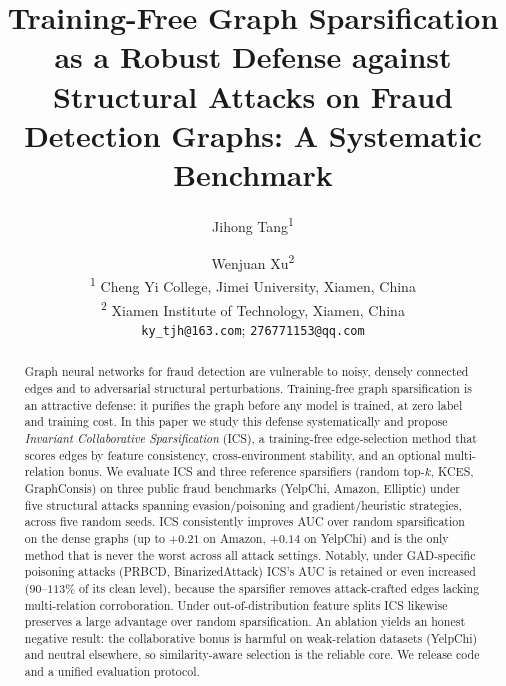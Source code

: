 \documentclass[11pt]{article}
\begin{document}
\title{Training-Free Graph Sparsification as a Robust Defense against Structural Attacks on Fraud Detection Graphs: A Systematic Benchmark}

\author{
Jihong Tang\textsuperscript{1} \and Wenjuan Xu\textsuperscript{2} \\
\textsuperscript{1} Cheng Yi College, Jimei University, Xiamen, China \\
\textsuperscript{2} Xiamen Institute of Technology, Xiamen, China \\
\texttt{ky\_tjh@163.com}; \texttt{276771153@qq.com}
}

\date{}

\maketitle

\begin{abstract}
Graph neural networks for fraud detection are vulnerable to noisy, densely connected edges and to adversarial structural perturbations. Training-free graph sparsification is an attractive defense: it purifies the graph before any model is trained, at zero label and training cost. In this paper we study this defense systematically and propose \emph{Invariant Collaborative Sparsification} (ICS), a training-free edge-selection method that scores edges by feature consistency, cross-environment stability, and an optional multi-relation bonus. We evaluate ICS and three reference sparsifiers (random top-$k$, KCES, GraphConsis) on three public fraud benchmarks (YelpChi, Amazon, Elliptic) under five structural attacks spanning evasion/poisoning and gradient/heuristic strategies, across five random seeds. ICS consistently improves AUC over random sparsification on the dense graphs (up to $+0.21$ on Amazon, $+0.14$ on YelpChi) and is the only method that is never the worst across all attack settings. Notably, under GAD-specific poisoning attacks (PRBCD, BinarizedAttack) ICS's AUC is retained or even increased ($90$--$113\%$ of its clean level), because the sparsifier removes attack-crafted edges lacking multi-relation corroboration. Under out-of-distribution feature splits ICS likewise preserves a large advantage over random sparsification. An ablation yields an honest negative result: the collaborative bonus is harmful on weak-relation datasets (YelpChi) and neutral elsewhere, so similarity-aware selection is the reliable core. We release code and a unified evaluation protocol.
\end{abstract}
\end{document}
